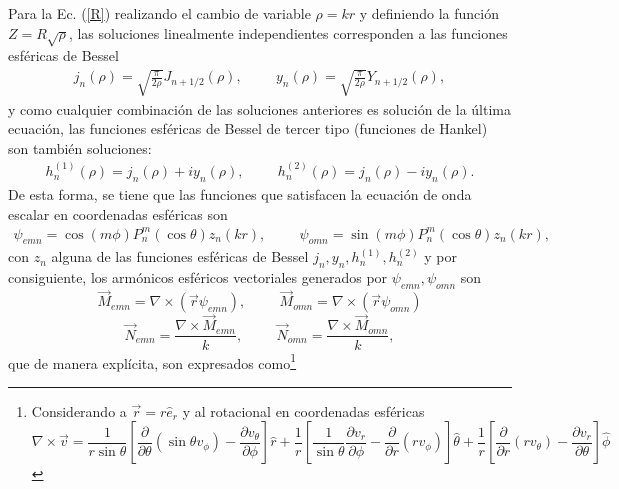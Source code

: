 \noindent Para la Ec. (\ref{R}) realizando el cambio de variable $\rho=kr$ y definiendo la función $Z=R\sqrt{\rho}$, las soluciones linealmente independientes corresponden a las funciones esféricas de Bessel
\begin{align*}
    j_n(\rho)=\sqrt{\frac{\pi}{2\rho}}J_{n+1/2}(\rho), \hspace{1cm}   y_n(\rho)=\sqrt{\frac{\pi}{2\rho}}Y_{n+1/2}(\rho),
\end{align*}
y como cualquier combinación de las soluciones anteriores es solución de la última ecuación, las funciones esféricas de Bessel de tercer tipo (funciones de Hankel) son también soluciones:
\begin{align*}
    h_n^{(1)}(\rho)=j_n(\rho)+iy_n(\rho),\hspace{1cm} h_n^{(2)}(\rho)=j_n(\rho)-iy_n(\rho).
\end{align*}
De esta forma, se tiene que las funciones que satisfacen la ecuación de onda escalar en coordenadas esféricas son
\begin{align*}
    \psi_{emn}=\cos (m\phi)P_n^m(\cos\theta)z_n(kr),\hspace{1cm}
    \psi_{omn}=\sin(m\phi)P_n^m(\cos\theta)z_n(kr),
\end{align*}
con $z_n$ alguna de las funciones esféricas de Bessel $j_n,y_n,h_n^{(1)},h_n^{(2)}$ y por consiguiente, los armónicos esféricos vectoriales generados por $\psi_{emn},\psi_{omn}$ son
$$\Vec{M}_{emn}=\nabla\times(\Vec{r}\psi_{emn}),\hspace{1cm}\Vec{M}_{omn}=\nabla\times(\Vec{r}\psi_{omn})$$
$$\Vec{N}_{emn}=\frac{\nabla\times\Vec{M}_{emn}}{k},\hspace{1cm}\Vec{N}_{omn}=\frac{\nabla\times\Vec{M}_{omn}}{k},$$
que de manera explícita, son expresados como\footnote{Considerando a $\Vec{r}=r\hat{e}_r$ y al rotacional en coordenadas esféricas $$\nabla\times\Vec{v}=\frac{1}{r\sin\theta}\left[\frac{\partial}{\partial\theta} (\sin\theta v_{\phi})-\frac{\partial v_\theta}{\partial\phi}\right]\hat{r}+\frac{1}{r}\left[\frac{1}{\sin\theta}\frac{\partial v_r}{\partial\phi}-\frac{\partial}{\partial r}(rv_\phi)\right]\hat{\theta}+\frac{1}{r}\left[\frac{\partial}{\partial r}(r v_\theta)-\frac{\partial v_r}{\partial\theta}\right]\hat{\phi}$$
} 


